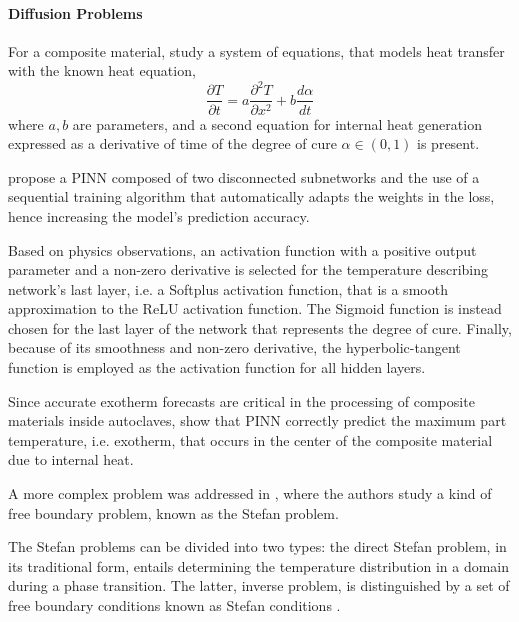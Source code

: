 \documentclass[pdflatex,sn-basic]{sn-jnl}%
\theoremstyle{thmstyleone}%
\theoremstyle{thmstyletwo}%
\theoremstyle{thmstylethree}%
\begin{document}
\paragraph{Diffusion Problems}
For a composite material, \cite{Ami2021_PhysicsInformedNeural_HagANHC} study a system of equations, that models heat transfer with the known heat equation, 
\begin{equation*} 
    \frac{\partial T}{\partial t} = 
    a \frac{\partial^2 T}{\partial x^2}
    + b \frac{d \alpha}{d t}
\end{equation*}
where $a,b$ are parameters, and a second equation for  internal heat generation  expressed as a derivative of time of the degree of cure $\alpha \in (0,1)$ is present.

\cite{Ami2021_PhysicsInformedNeural_HagANHC} propose a PINN composed of two disconnected subnetworks and the use of a sequential training algorithm that automatically adapts the weights in the loss, hence increasing the model's prediction accuracy. 

Based on physics observations, an activation function with a positive output parameter and a non-zero derivative is selected for the temperature describing network's last layer, i.e. a Softplus activation function, that is a smooth approximation to the ReLU activation function.
The Sigmoid function is instead chosen for the last layer of the network that represents the degree of cure. %
Finally, because of its smoothness and non-zero derivative, the hyperbolic-tangent function is employed as the activation function for all hidden layers. 

Since accurate exotherm forecasts are critical in the processing of composite materials inside autoclaves, \cite{Ami2021_PhysicsInformedNeural_HagANHC} show that PINN correctly predict the maximum part temperature, i.e. exotherm, that occurs in the center of the composite material due to internal heat.

A more complex problem was addressed in \cite{Cai2021_PhysicsInformedNeural_WanCWW}, where the authors study a kind of free boundary problem, known as the Stefan problem.

The Stefan problems can be divided into two types: the direct Stefan problem, in its traditional form, entails determining the temperature distribution in a domain during a phase transition. The latter, inverse problem, is distinguished by a set of free boundary conditions known as Stefan conditions \cite{Wan2021_DeepLearningFree_PerWP}.
\end{document}
